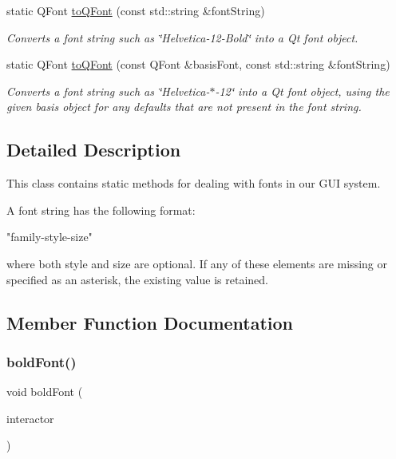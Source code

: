 \begin{DoxyCompactItemize}
static Q\+Font \mbox{\hyperlink{classGFont_aea0f70979b631219291103391bfacc6e}{to\+Q\+Font}} (const std\+::string \&font\+String)
\begin{DoxyCompactList}\small\item\em Converts a font string such as \char`\"{}\+Helvetica-\/12-\/\+Bold\char`\"{} into a Qt font object. \end{DoxyCompactList}\item 
static Q\+Font \mbox{\hyperlink{classGFont_a7eea6ca714d168dc53c86124bb4fc387}{to\+Q\+Font}} (const Q\+Font \&basis\+Font, const std\+::string \&font\+String)
\begin{DoxyCompactList}\small\item\em Converts a font string such as \char`\"{}\+Helvetica-\/$\ast$-\/12\char`\"{} into a Qt font object, using the given \textquotesingle{}basis\textquotesingle{} object for any defaults that are not present in the font string. \end{DoxyCompactList}\end{DoxyCompactItemize}


\subsection{Detailed Description}
This class contains static methods for dealing with fonts in our G\+UI system. 

A font string has the following format\+:


\begin{DoxyPre}
"family-style-size"
\end{DoxyPre}


where both {\ttfamily style} and {\ttfamily size} are optional. If any of these elements are missing or specified as an asterisk, the existing value is retained. 

\subsection{Member Function Documentation}
\mbox{\label{classGFont_ae709c4560c613217490269d4df94602c}} 
\subsubsection{\texorpdfstring{bold\+Font()}{boldFont()}}
{\footnotesize\ttfamily void bold\+Font (\begin{DoxyParamCaption}\item[{\mbox{\hyperlink{classGInteractor}{G\+Interactor}} $\ast$}]{interactor }\end{DoxyParamCaption})\hspace{0.3cm}{\ttfamily [static]}}



